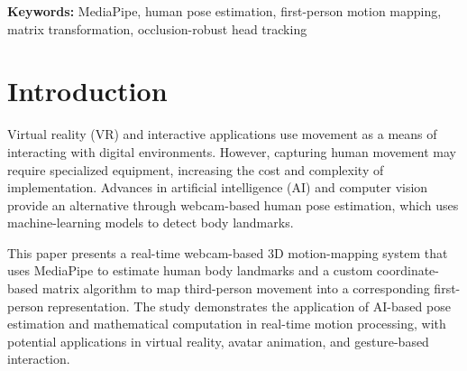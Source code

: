 \documentclass[12pt,a4paper]{article}
\begin{document}
\begin{abstract}
\noindent This paper presents a webcam-based prototype that maps third-person hand landmarks into a first-person coordinate representation. The system uses MediaPipe Pose, Hand, and Face Landmarkers to estimate body, hand, and facial information from webcam frames. A head-relative coordinate frame is established using estimated head position and orientation, and a $4\times4$ homogeneous matrix transformation is used to express wrist and finger landmarks relative to that frame. To reduce instability when the face is partially covered, the prototype applies confidence-aware head-pose estimation by considering landmark visibility and hand occlusion, combining facial and pose-based orientation estimates, and using temporal prediction and adaptive smoothing. The paper explains the mathematical concepts and processing stages behind the prototype, presents its implementation, and identifies tests needed to evaluate detection continuity, view stability, recovery behavior, and processing speed. The output is a geometric representation of mapped hands and fingers rather than a reconstructed photographic first-person scene. Quantitative performance and integration with external game or VR applications remain subjects for further testing.
\end{abstract}

\noindent\textbf{Keywords:} MediaPipe, human pose estimation, first-person motion mapping, matrix transformation, occlusion-robust head tracking

\newpage
\tableofcontents
\newpage

\setcounter{page}{1}

\section{Introduction}

Virtual reality (VR) and interactive applications use movement as a means of interacting with digital environments. However, capturing human movement may require specialized equipment, increasing the cost and complexity of implementation. Advances in artificial intelligence (AI) and computer vision provide an alternative through webcam-based human pose estimation, which uses machine-learning models to detect body landmarks.

This paper presents a real-time webcam-based 3D motion-mapping system that uses MediaPipe to estimate human body landmarks and a custom coordinate-based matrix algorithm to map third-person movement into a corresponding first-person representation. The study demonstrates the application of AI-based pose estimation and mathematical computation in real-time motion processing, with potential applications in virtual reality, avatar animation, and gesture-based interaction.
\end{document}

